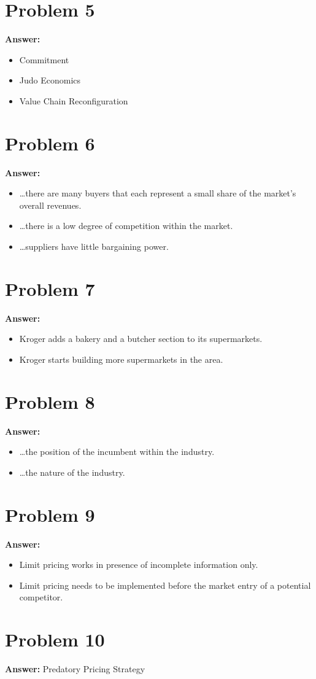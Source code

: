 \documentclass[11pt]{article}
\begin{document}
\section*{Problem 5}
\label{sec:org43ed584}

\textbf{Answer:}
\begin{itemize}
\item Commitment
\item Judo Economics
\item Value Chain Reconfiguration
\end{itemize}
\section*{Problem 6}
\label{sec:org5ec5c4e}

\textbf{Answer:}
\begin{itemize}
\item \ldots{}there are many buyers that each represent a small share of the market's
overall revenues.
\item \ldots{}there is a low degree of competition within the market.
\item \ldots{}suppliers have little bargaining power.
\end{itemize}
\section*{Problem 7}
\label{sec:orgb4c03e7}

\textbf{Answer:}
\begin{itemize}
\item Kroger adds a bakery and a butcher section to its supermarkets.
\item Kroger starts building more supermarkets in the area.
\end{itemize}
\section*{Problem 8}
\label{sec:org9dff8e5}

\textbf{Answer:}
\begin{itemize}
\item \ldots{}the position of the incumbent within the industry.
\item \ldots{}the nature of the industry.
\end{itemize}
\section*{Problem 9}
\label{sec:org402feb5}

\textbf{Answer:}
\begin{itemize}
\item Limit pricing works in presence of incomplete information only.
\item Limit pricing needs to be implemented before the market entry of a potential
competitor.
\end{itemize}
\section*{Problem 10}
\label{sec:org7f4ba8c}

\textbf{Answer:} Predatory Pricing Strategy
\end{document}
